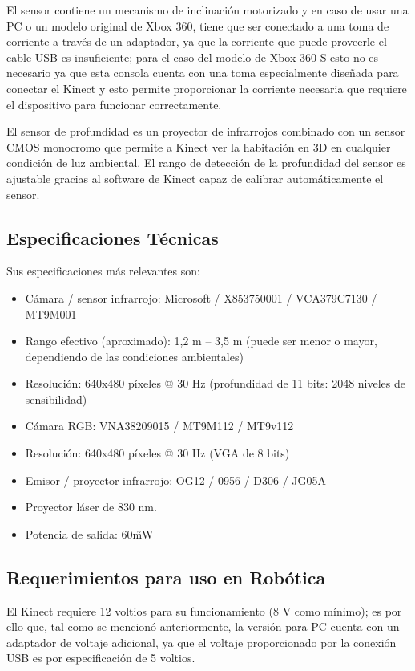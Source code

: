 El sensor contiene un mecanismo de inclinación motorizado y en caso de usar una PC o un modelo original de Xbox 360, tiene que ser conectado a una toma de corriente a través de un adaptador, ya que la corriente que puede proveerle el cable USB es insuficiente; para el caso del modelo de Xbox 360 S esto no es necesario ya que esta consola cuenta con una toma especialmente diseñada para conectar el Kinect y esto permite proporcionar la corriente necesaria que requiere el dispositivo para funcionar correctamente.

El sensor de profundidad es un proyector de infrarrojos combinado con un sensor CMOS monocromo que permite a Kinect ver la habitación en 3D en cualquier condición de luz ambiental. El rango de detección de la profundidad del sensor es ajustable gracias al software de Kinect capaz de calibrar automáticamente el sensor.

\subsection{Especificaciones Técnicas}
Sus especificaciones \cite{openkinecthardware} \cite{ifixitkinect} más relevantes son:

\begin{itemize}
	\itemsep1pt \parskip1pt 
	\item Cámara / sensor infrarrojo: Microsoft / X853750001 / VCA379C7130 / MT9M001
	\item Rango efectivo (aproximado): 1,2 m – 3,5 m (puede ser menor o mayor, dependiendo de las condiciones ambientales)
	\item Resolución: 640x480 píxeles @ 30 Hz (profundidad de 11 bits: 2048 niveles de sensibilidad)
	\item Cámara RGB: VNA38209015 / MT9M112 / MT9v112
	\item Resolución: 640x480 píxeles @ 30 Hz (VGA de 8 bits)
	\item Emisor / proyector infrarrojo: OG12 / 0956 / D306 / JG05A
	\item Proyector láser de 830 nm.
	\item Potencia de salida: 60\~ mW
\end{itemize}

\subsection{Requerimientos para uso en Robótica}

El Kinect requiere 12 voltios \cite{openkinecthardware} para su funcionamiento (8 V como mínimo); es por ello que, tal como se mencionó anteriormente, la versión para PC cuenta con un adaptador de voltaje adicional, ya que el voltaje proporcionado por la conexión USB es por especificación de 5 voltios.

